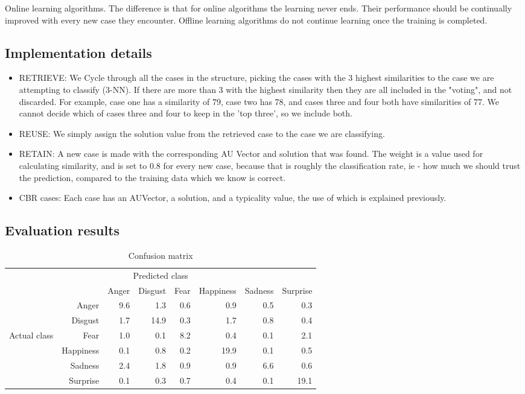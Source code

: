\documentclass[12pt]{article}
\begin{document}
Online learning algorithms. The difference is that for online algorithms the learning never ends. Their performance should be continually improved with every new case they encounter. Offline learning algorithms do not continue learning once the training is completed.

\subsection*{Implementation details}
\begin{itemize}
  \item RETRIEVE:
    We Cycle through all the cases in the structure, picking the cases with the 3 highest similarities to the case we are attempting to classify (3-NN). If there are more than 3 with the highest similarity then they are all included in the "voting", and not discarded. For example, case one has a similarity of 79, case two has 78, and cases three and four both have similarities of 77. We cannot decide which of cases three and four to keep in the 'top three', so we include both.
  \item REUSE:
    We simply assign the solution value from the retrieved case to the case we are classifying.
  \item RETAIN:
    A new case is made with the corresponding AU Vector and solution that was found. The weight is a value used for calculating similarity, and is set to 0.8 for every new case, because that is roughly the classification rate, ie - how much we should trust the prediction, compared to the training data which we know is correct.
  \item CBR cases:
    Each case has an AUVector, a solution, and a typicality value, the use of which is explained previously.
\end{itemize}

\subsection*{Evaluation results}

\begin{table}
\centering
\begin{tabular}{r r | r r r r r r}
\multicolumn{8}{c}{Predicted class} \\
&  & Anger & Disgust & Fear & Happiness & Sadness & Surprise \\
\hline
 & Anger            & 9.6 & 1.3  & 0.6 & 0.9  & 0.5 & 0.3  \\
 & Disgust          & 1.7 & 14.9 & 0.3 & 1.7  & 0.8 & 0.4  \\
Actual class & Fear & 1.0 & 0.1  & 8.2 & 0.4  & 0.1 & 2.1  \\
 & Happiness        & 0.1 & 0.8  & 0.2 & 19.9 & 0.1 & 0.5  \\
 & Sadness          & 2.4 & 1.8  & 0.9 & 0.9  & 6.6 & 0.6  \\
 & Surprise         & 0.1 & 0.3  & 0.7 & 0.4  & 0.1 & 19.1 \\
\end{tabular} 
\caption{Confusion matrix}
\end{table}
\end{document}
